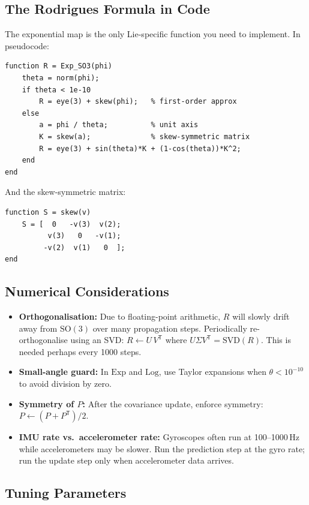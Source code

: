 \documentclass[11pt,letterpaper]{article}
\newcommand{\SO}{\mathrm{SO}(3)}
\newcommand{\expmap}{\mathrm{Exp}}
\newcommand{\logmap}{\mathrm{Log}}
\begin{document}
\subsection{The Rodrigues Formula in Code}

The exponential map is the only Lie-specific function you need to
implement.  In pseudocode:

\begin{verbatim}
function R = Exp_SO3(phi)
    theta = norm(phi);
    if theta < 1e-10
        R = eye(3) + skew(phi);   % first-order approx
    else
        a = phi / theta;          % unit axis
        K = skew(a);              % skew-symmetric matrix
        R = eye(3) + sin(theta)*K + (1-cos(theta))*K^2;
    end
end
\end{verbatim}

And the skew-symmetric matrix:

\begin{verbatim}
function S = skew(v)
    S = [  0   -v(3)  v(2);
          v(3)   0   -v(1);
         -v(2)  v(1)   0  ];
end
\end{verbatim}

\subsection{Numerical Considerations}

\begin{itemize}
  \item \textbf{Orthogonalisation:}  Due to floating-point
    arithmetic, $R$ will slowly drift away from $\SO$ over many
    propagation steps.  Periodically re-orthogonalise using an SVD:
    $R \leftarrow U\,V^{\mathsf{T}}$ where $U\Sigma V^{\mathsf{T}}
    = \text{SVD}(R)$.  This is needed perhaps every 1000 steps.
  \item \textbf{Small-angle guard:}  In $\expmap$ and $\logmap$,
    use Taylor expansions when $\theta < 10^{-10}$ to avoid
    division by zero.
  \item \textbf{Symmetry of $P$:}  After the covariance update,
    enforce symmetry: $P \leftarrow (P + P^{\mathsf{T}})/2$.
  \item \textbf{IMU rate vs.\ accelerometer rate:}  Gyroscopes
    often run at 100--1000\,Hz while accelerometers may be slower.
    Run the prediction step at the gyro rate; run the update step
    only when accelerometer data arrives.
\end{itemize}

\subsection{Tuning Parameters}
\end{document}
